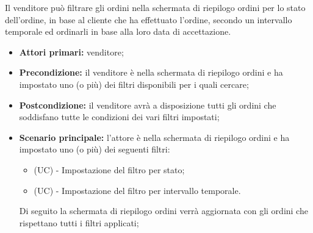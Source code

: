Il venditore può filtrare gli ordini nella schermata di riepilogo ordini per lo stato dell'ordine, in base al cliente che ha effettuato l'ordine, secondo un intervallo temporale ed ordinarli in base alla loro data di accettazione.
\begin{itemize}
	\item \textbf{Attori primari:} venditore;
	\item \textbf{Precondizione:} il venditore è nella schermata di riepilogo ordini e ha impostato uno (o più) dei filtri disponibili per i quali cercare;
	\item \textbf{Postcondizione:} il venditore avrà a disposizione tutti gli ordini che soddisfano tutte le condizioni dei vari filtri impostati;
	\item \textbf{Scenario principale:} l'attore è nella schermata di riepilogo ordini e ha impostato uno (o più) dei seguenti filtri:
	\begin{itemize}
		\item (UC) - Impostazione del filtro per stato;
		\item (UC) - Impostazione del filtro per intervallo temporale.
	\end{itemize}
	Di seguito la schermata di riepilogo ordini verrà aggiornata con gli ordini che rispettano tutti i filtri applicati;
\end{itemize}

